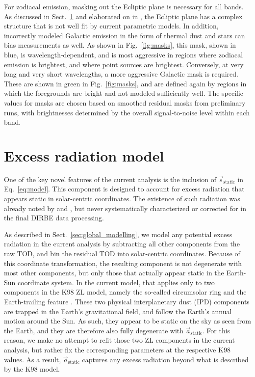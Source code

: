 \documentclass{aa}
\newcommand{\s}[0]{\vec{s}}
\renewcommand{\a}[0]{\vec{a}}
\begin{document}
For zodiacal emission, masking out the Ecliptic plane is necessary for all bands. As discussed in Sect.~\ref{sec:excess} and elaborated on in \citet{CG02_02}, the Ecliptic plane has a complex structure that is not well fit by current parametric models. In addition, incorrectly modeled Galactic emission in the form of thermal dust and stars can bias measurements as well. As shown in Fig.~\ref{fig:masks}, this mask, shown in blue, is wavelength-dependent, and is most aggressive in regions where zodiacal emission is brightest, and where point sources are brightest.
Conversely, at very long and very short wavelengths, a more aggressive Galactic mask is required. These are shown in green in Fig.~\ref{fig:masks}, and are defined again by regions in which the foregrounds are bright and not modeled sufficiently well. {The specific values for masks are chosen based on smoothed residual masks from preliminary runs, with brightnesses determined by the overall signal-to-noise level within each band.}



\section{Excess radiation model}
\label{sec:excess}


One of the key novel features of the current analysis is the inclusion
of $\s_{\mathrm{static}}$ in Eq.~\eqref{eq:model}. This component is
designed to account for excess radiation that appears static in
solar-centric coordinates. The existence of such radiation was already
noted by \citet{reach:1995} and \citet{leinert:1998}, but never
systematically characterized or corrected for in the final DIRBE data
processing.

As described in Sect.~\ref{sec:global_modelling}, we model any
potential excess radiation in the current analysis by subtracting all
other components from the raw TOD, and bin the residual TOD into
solar-centric coordinates. Because of this coordinate transformation,
the resulting component is not degenerate with most other components,
but only those that actually appear static in the Earth-Sun coordinate
system. In the current model, that applies only to two components in the
K98 ZL model, namely the so-called circumsolar ring and the
Earth-trailing feature \citep{kelsall1998}. These two physical
interplanetary dust (IPD) components are trapped in the Earth's
gravitational field, and follow the Earth's annual motion around the
Sun. As such, they appear to be static on the sky as seen from the
Earth, and they are therefore also fully degenerate with
$\a_{\mathrm{static}}$. For this reason, we make no attempt to refit
those two ZL components in the current analysis, but rather fix the
corresponding parameters at the respective K98 values. As a result,
$\a_{\mathrm{static}}$ captures any excess radiation beyond what is
described by the K98 model.
\end{document}
